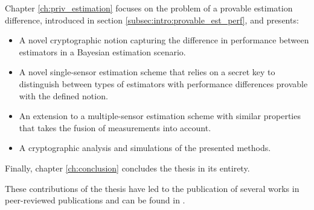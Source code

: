 Chapter \ref{ch:priv_estimation} focuses on the problem of a provable estimation difference, introduced in section \ref{subsec:intro:provable_est_perf}, and presents:
\begin{itemize}
    \item A novel cryptographic notion capturing the difference in performance between estimators in a Bayesian estimation scenario.
    \item A novel single-sensor estimation scheme that relies on a secret key to distinguish between types of estimators with performance differences provable with the defined notion.
    \item An extension to a multiple-sensor estimation scheme with similar properties that takes the fusion of measurements into account.
    \item A cryptographic analysis and simulations of the presented methods.
\end{itemize}

Finally, chapter \ref{ch:conclusion} concludes the thesis in its entirety.

These contributions of the thesis have led to the publication of several works in peer-reviewed publications and can be found in .
